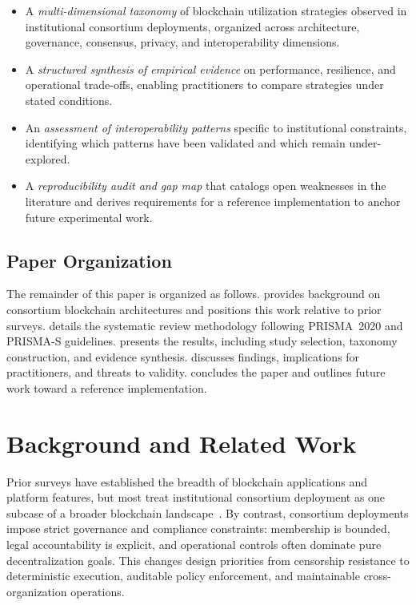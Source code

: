 \documentclass[journal]{IEEEtran}
\begin{document}
\begin{itemize}
  \item A \emph{multi-dimensional taxonomy} of blockchain utilization strategies observed in institutional consortium deployments, organized across architecture, governance, consensus, privacy, and interoperability dimensions.
  \item A \emph{structured synthesis of empirical evidence} on performance, resilience, and operational trade-offs, enabling practitioners to compare strategies under stated conditions.
  \item An \emph{assessment of interoperability patterns} specific to institutional constraints, identifying which patterns have been validated and which remain under-explored.
  \item A \emph{reproducibility audit and gap map} that catalogs open weaknesses in the literature and derives requirements for a reference implementation to anchor future experimental work.
\end{itemize}

\subsection{Paper Organization}

The remainder of this paper is organized as follows.
 provides background on consortium blockchain architectures and positions this work relative to prior surveys.
 details the systematic review methodology following PRISMA~2020 and PRISMA-S guidelines.
 presents the results, including study selection, taxonomy construction, and evidence synthesis.
 discusses findings, implications for practitioners, and threats to validity.
 concludes the paper and outlines future work toward a reference implementation.

\section{Background and Related Work}
\label{sec:background}

Prior surveys have established the breadth of blockchain applications and platform features, but most treat institutional consortium deployment as one subcase of a broader blockchain landscape~\cite{casino2019systematic,wang2019blockchain,ali2020comparative}.
By contrast, consortium deployments impose strict governance and compliance constraints: membership is bounded, legal accountability is explicit, and operational controls often dominate pure decentralization goals.
This changes design priorities from censorship resistance to deterministic execution, auditable policy enforcement, and maintainable cross-organization operations.
\end{document}
